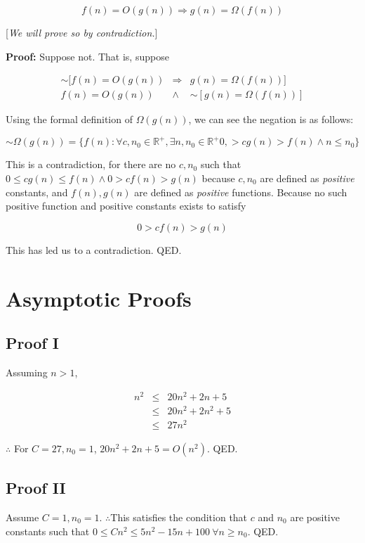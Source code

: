 \documentclass{article}
\begin{document}
\begin{equation}
f(n) = O(g(n)) \Rightarrow g(n) = \Omega (f(n))
\end{equation}

[\textit{We will prove so by contradiction.}]

\noindent
\textbf{Proof: } Suppose not. That is, suppose

\begin{eqnarray}
\sim [f(n) = O(g(n)) & \Rightarrow & g(n) = \Omega (f(n))] \\
f(n) = O(g(n)) & \wedge & \sim [g(n) = \Omega (f(n))]
\end{eqnarray}

Using the formal definition of $\Omega(g(n))$, we can see the negation is as follows:

\begin{equation}
\sim \Omega(g(n)) = \{ f(n) : \forall c, n_0 \in \mathbb{R}^+, \exists n, n_0 \in \mathbb{R}^+ 0, > cg(n) > f(n) \wedge n \leq n_0 \}
\end{equation}

This is a contradiction, for there are no $c, n_0$ such that $0 \leq c g(n) \leq f(n) \wedge 0 > cf(n) > g(n)$ because $c, n_0$ are defined as \textit{positive} constants, and $f(n), g(n)$ are defined as \textit{positive} functions. Because no such positive function and positive constants exists to satisfy

\begin{equation}
0 > cf(n) > g(n)
\end{equation}

This has led us to a contradiction. QED.

\section{Asymptotic Proofs}
\subsection{Proof I}
Assuming $n > 1$,

\begin{eqnarray}
n^2 & \leq & 20n^2 + 2n + 5 \\
& \leq & 20n^2 + 2n^2 + 5 \\
& \leq & 27n^2
\end{eqnarray}

$\therefore$ For $C = 27, n_0 = 1$, $20n^2 + 2n + 5 = O(n^2)$. QED.

\subsection{Proof II}
Assume $C = 1, n_0 = 1$. $\therefore $This satisfies the condition that
$c$ and $n_0$ are positive constants such that $0 \leq Cn^2 \leq 5n^2 - 15n + 100 \ \forall n \geq n_0$. QED.
\end{document}
